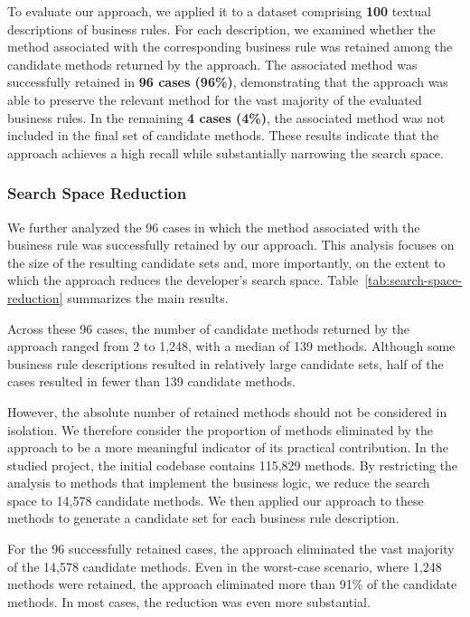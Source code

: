 To evaluate our approach, we applied it to a dataset comprising \textbf{100} textual descriptions of business rules. For each description, we examined whether the method associated with the corresponding business rule was retained among the candidate methods returned by the approach. The associated method was successfully retained in \textbf{96 cases (96\%)}, demonstrating that the approach was able to preserve the relevant method for the vast majority of the evaluated business rules. In the remaining \textbf{4 cases (4\%)}, the associated method was not included in the final set of candidate methods. These results indicate that the approach achieves a high recall while substantially narrowing the search space.

\vspace{-0.3em}

\subsubsection{Search Space Reduction}\noindent

We further analyzed the 96 cases in which the method associated with the business rule was successfully retained by our approach. This analysis focuses on the size of the resulting candidate sets and, more importantly, on the extent to which the approach reduces the developer's search space. Table~\ref{tab:search-space-reduction} summarizes the main results.

Across these 96 cases, the number of candidate methods returned by the approach ranged from 2 to 1,248, with a median of 139 methods. Although some business rule descriptions resulted in relatively large candidate sets, half of the cases resulted in fewer than 139 candidate methods.

However, the absolute number of retained methods should not be considered in isolation. We therefore consider the proportion of methods eliminated by the approach to be a more meaningful indicator of its practical contribution. In the studied project, the initial codebase contains 115,829 methods. By restricting the analysis to methods that implement the business logic, we reduce the search space to 14,578 candidate methods. We then applied our approach to these methods to generate a candidate set for each business rule description.

For the 96 successfully retained cases, the approach eliminated the vast majority of the 14,578 candidate methods. Even in the worst-case scenario, where 1,248 methods were retained, the approach eliminated more than 91\% of the candidate methods. In most cases, the reduction was even more substantial.

